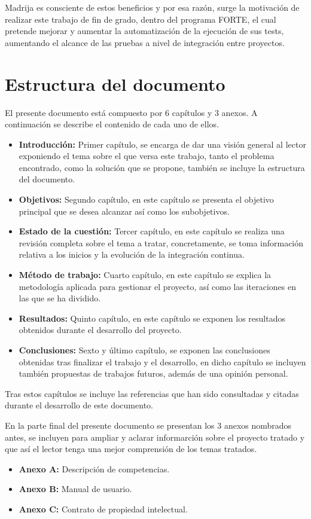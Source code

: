 \clearpage

\ac{Madrija} es consciente de estos beneficios y por esa razón, surge la motivación de realizar este trabajo de fin de grado, dentro del programa FORTE, el cual pretende mejorar y aumentar la automatización de la ejecución de sus tests, aumentando el alcance de las pruebas a nivel de integración entre proyectos.

\section{Estructura del documento}

El presente documento está compuesto por 6 capítulos y 3 anexos. A continuación se describe el contenido de cada uno de ellos.

\begin{itemize}
\item \textbf{Introducción:} Primer capítulo, se encarga de dar una visión general al lector exponiendo el tema sobre el que versa este trabajo, tanto el problema encontrado, como la solución que se propone, también se incluye la estructura del documento.
\item \textbf{Objetivos:} Segundo capítulo, en este capítulo se presenta el objetivo principal que se desea alcanzar así como los subobjetivos.
\item \textbf{Estado de la cuestión:} Tercer capítulo, en este capítulo se realiza una revisión completa sobre el tema a tratar, concretamente, se toma información relativa a los inicios y la evolución de la integración continua.
\item \textbf{Método de trabajo:} Cuarto capítulo, en este capítulo se explica la metodología aplicada para gestionar el proyecto, así como las iteraciones en las que se ha dividido.
\item \textbf{Resultados:} Quinto capítulo, en este capítulo se exponen los resultados obtenidos durante el desarrollo del proyecto.
\item \textbf{Conclusiones:} Sexto y último capítulo, se exponen las conclusiones obtenidas tras finalizar el trabajo y el desarrollo, en dicho capítulo se incluyen también propuestas de trabajos futuros, además de una opinión personal.
\end{itemize}

Tras estos capítulos se incluye las referencias que han sido consultadas y citadas durante el desarrollo de este documento.

En la parte final del presente documento se presentan los 3 anexos nombrados antes, se incluyen para ampliar y aclarar informarción sobre el proyecto tratado y que así el lector tenga una mejor comprensión de los temas tratados.

\begin{itemize}
\item \textbf{Anexo A:} Descripción de competencias.
\item \textbf{Anexo B:} Manual de usuario.
\item \textbf{Anexo C:} Contrato de propiedad intelectual.
\end{itemize}
